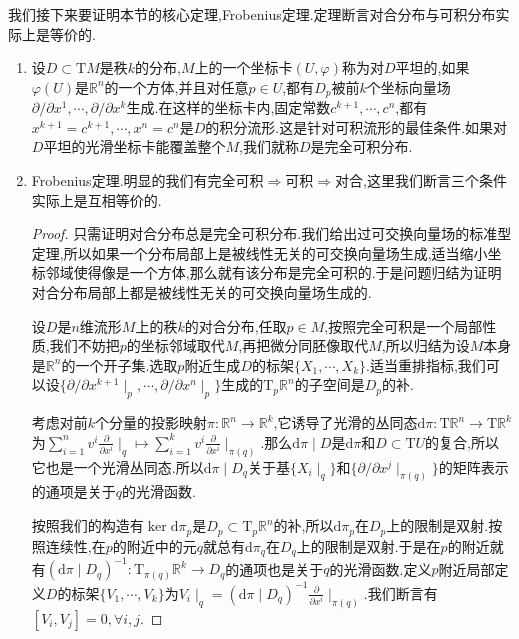 我们接下来要证明本节的核心定理,Frobenius定理.定理断言对合分布与可积分布实际上是等价的.
\begin{enumerate}
	\item 设$D\subset\mathrm{T}M$是秩$k$的分布,$M$上的一个坐标卡$(U,\varphi)$称为对$D$平坦的,如果$\varphi(U)$是$\mathbb{R}^n$的一个方体,并且对任意$p\in U$,都有$D_p$被前$k$个坐标向量场$\partial/\partial x^1,\cdots,\partial/\partial x^k$生成.在这样的坐标卡内,固定常数$c^{k+1},\cdots,c^n$,都有$x^{k+1}=c^{k+1},\cdots,x^n=c^n$是$D$的积分流形.这是针对可积流形的最佳条件.如果对$D$平坦的光滑坐标卡能覆盖整个$M$,我们就称$D$是完全可积分布.
	\item Frobenius定理.明显的我们有完全可积$\Rightarrow$可积$\Rightarrow$对合,这里我们断言三个条件实际上是互相等价的.
	\begin{proof}
		
		只需证明对合分布总是完全可积分布.我们给出过可交换向量场的标准型定理,所以如果一个分布局部上是被线性无关的可交换向量场生成,适当缩小坐标邻域使得像是一个方体,那么就有该分布是完全可积的.于是问题归结为证明对合分布局部上都是被线性无关的可交换向量场生成的.
		
		设$D$是$n$维流形$M$上的秩$k$的对合分布,任取$p\in M$,按照完全可积是一个局部性质,我们不妨把$p$的坐标邻域取代$M$,再把微分同胚像取代$M$,所以归结为设$M$本身是$\mathbb{R}^n$的一个开子集.选取$p$附近生成$D$的标架$\{X_1,\cdots,X_k\}$.适当重排指标,我们可以设$\{\partial/\partial x^{k+1}\mid_p,\cdots,\partial/\partial x^n\mid_p\}$生成的$\mathrm{T}_p\mathbb{R}^n$的子空间是$D_p$的补.
		
		考虑对前$k$个分量的投影映射$\pi:\mathbb{R}^n\to\mathbb{R}^k$,它诱导了光滑的丛同态$\mathrm{d}\pi:\mathrm{T}\mathbb{R}^n\to\mathrm{T}\mathbb{R}^k$为$\sum_{i=1}^nv^i\frac{\partial}{\partial x^i}\mid_q\mapsto\sum_{i=1}^kv^i\frac{\partial}{\partial x^i}\mid_{\pi(q)}$.那么$\mathrm{d}\pi\mid D$是$\mathrm{d}\pi$和$D\subset\mathrm{T}U$的复合,所以它也是一个光滑丛同态.所以$\mathrm{d}\pi\mid D_q$关于基$\{X_i\mid_q\}$和$\{\partial/\partial x^j\mid_{\pi(q)}\}$的矩阵表示的通项是关于$q$的光滑函数.
		
		按照我们的构造有$\ker\mathrm{d}\pi_p$是$D_p\subset\mathrm{T}_p\mathbb{R}^n$的补,所以$\mathrm{d}\pi_p$在$D_p$上的限制是双射.按照连续性,在$p$的附近中的元$q$就总有$\mathrm{d}\pi_q$在$D_q$上的限制是双射.于是在$p$的附近就有$(\mathrm{d}\pi\mid D_q)^{-1}:\mathrm{T}_{\pi(q)}\mathbb{R}^k\to D_q$的通项也是关于$q$的光滑函数.定义$p$附近局部定义$D$的标架$\{V_1,\cdots,V_k\}$为$V_i\mid_q=(\mathrm{d}\pi\mid D_q)^{-1}\frac{\partial}{\partial x^i}\mid_{\pi(q)}$.我们断言有$[V_i,V_j]=0,\forall i,j$.
		

\end{proof}
\end{enumerate}
